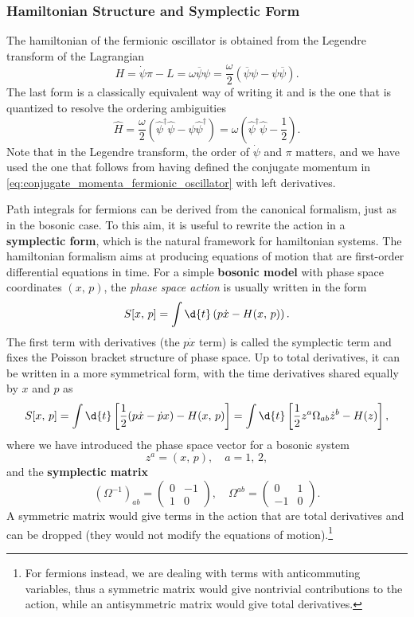 \subsubsection{Hamiltonian Structure and Symplectic Form}
The hamiltonian of the fermionic oscillator is obtained from the Legendre transform of the Lagrangian
\[
    H = \dot{\psi}\pi - L = \omega \overline{\psi} \psi = \frac{\omega}{2} \left( \overline{\psi} \psi - \psi \overline{\psi} \right).
\]
The last form is a classically equivalent way of writing it and is the one that is quantized to resolve the ordering ambiguities
\begin{equation}
    \hat{H} = \frac{\omega}{2} \left( \hat{\psi}^{\dagger} \hat{\psi} - \hat{\psi} \hat{\psi}^{\dagger} \right) = \omega \left( \hat{\psi}^{\dagger} \hat{\psi} - \frac{1}{2} \right).
    \label{eq:fermionic_oscillator_hamiltonian}
\end{equation}
Note that in the Legendre transform, the order of \(\dot{\psi}\) and \(\pi\) matters, and we have used the one that follows from having defined the conjugate momentum in \eqref{eq:conjugate_momenta_fermionic_oscillator} with left derivatives.

Path integrals for fermions can be derived from the canonical formalism, just as in the bosonic case. To this aim, it is useful to rewrite the action in a \textbf{symplectic form}, which is the natural framework for hamiltonian systems. The hamiltonian formalism aims at producing equations of motion that are first-order differential equations in time. For a simple \textbf{bosonic model} with phase space coordinates \((x,\,p)\), the \textit{phase space action} is usually written in the form
\[
    S[x,\,p] = \int \d{t} \left( p \dot{x} - H(x,\,p) \right).
\]
The first term with derivatives (the \(p\dot{x}\) term) is called the symplectic term and fixes the Poisson bracket structure of phase space. Up to total derivatives, it can be written in a more symmetrical form, with the time derivatives shared equally by \(x\) and \(p\) as
\[
    S[x,\,p] = \int \d{t} \left[\frac{1}{2} (p \dot{x} - \dot{p} x) - H(x,\,p) \right] = \int \d{t} \left[\frac{1}{2} z^a \Omega_{ab} \dot{z}^b - H(z)\right],
\]
where we have introduced the phase space vector for a bosonic system
\[
    z^a = (x,\,p), \quad a = 1,\,2,
\]
and the \textbf{symplectic matrix}
\[
    (\Omega^{-1})_{ab} = \begin{pmatrix}
        0 & -1 \\
        1 & 0
    \end{pmatrix}, \quad \Omega^{ab} = \begin{pmatrix}
        0  & 1 \\
        -1 & 0
    \end{pmatrix}.
\]
A symmetric matrix would give terms in the action that are total derivatives and can be dropped (they would not modify the equations of motion).\footnote{For fermions instead, we are dealing with terms with anticommuting variables, thus a symmetric matrix would give nontrivial contributions to the action, while an antisymmetric matrix would give total derivatives.}

